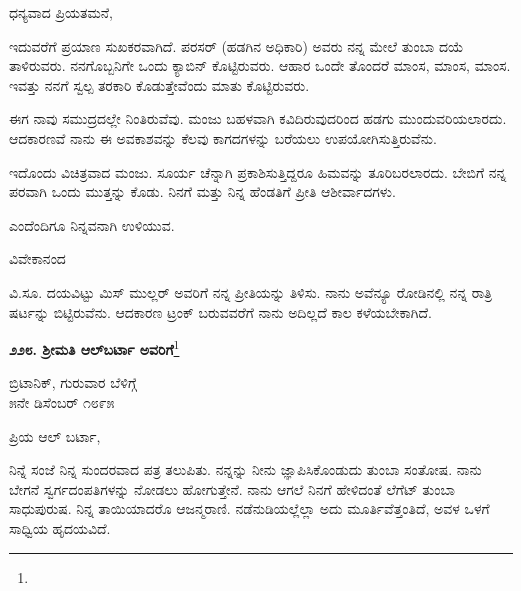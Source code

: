 \noindent
ಧನ್ಯವಾದ ಪ್ರಿಯತಮನೆ,

ಇದುವರೆಗೆ ಪ್ರಯಾಣ ಸುಖಕರವಾಗಿದೆ. ಪರಸರ್ (ಹಡಗಿನ ಅಧಿಕಾರಿ) ಅವರು ನನ್ನ ಮೇಲೆ ತುಂಬಾ ದಯೆ ತಾಳಿರುವರು. ನನಗೊಬ್ಬನಿಗೇ ಒಂದು ಕ್ಯಾಬಿನ್ ಕೊಟ್ಟಿರುವರು. ಆಹಾರ ಒಂದೇ ತೊಂದರೆ\enginline{-} ಮಾಂಸ, ಮಾಂಸ, ಮಾಂಸ. ಇವತ್ತು ನನಗೆ ಸ್ವಲ್ಪ ತರಕಾರಿ ಕೊಡುತ್ತೇವೆಂದು ಮಾತು ಕೊಟ್ಟಿರುವರು.

ಈಗ ನಾವು ಸಮುದ್ರದಲ್ಲೇ ನಿಂತಿರುವೆವು. ಮಂಜು ಬಹಳವಾಗಿ ಕವಿದಿರುವುದರಿಂದ ಹಡಗು ಮುಂದುವರಿಯಲಾರದು. ಆದಕಾರಣವೆ ನಾನು ಈ ಅವಕಾಶವನ್ನು ಕೆಲವು ಕಾಗದಗಳನ್ನು ಬರೆಯಲು ಉಪಯೋಗಿಸುತ್ತಿರುವೆನು.

ಇದೊಂದು ವಿಚಿತ್ರವಾದ ಮಂಜು. ಸೂರ್ಯ ಚೆನ್ನಾಗಿ ಪ್ರಕಾಶಿಸುತ್ತಿದ್ದರೂ ಹಿಮವನ್ನು ತೂರಿಬರಲಾರದು. ಬೇಬಿಗೆ ನನ್ನ ಪರವಾಗಿ ಒಂದು ಮುತ್ತನ್ನು ಕೊಡು. ನಿನಗೆ ಮತ್ತು ನಿನ್ನ ಹೆಂಡತಿಗೆ ಪ್ರೀತಿ ಆಶೀರ್ವಾದಗಳು.

ಎಂದೆಂದಿಗೂ ನಿನ್ನವನಾಗಿ ಉಳಿಯುವ.

\begin{flushright}
ವಿವೇಕಾನಂದ
\end{flushright}

ವಿ.ಸೂ.\enginline{-} ದಯವಿಟ್ಟು ಮಿಸ್ ಮುಲ್ಲರ್ ಅವರಿಗೆ ನನ್ನ ಪ್ರೀತಿಯನ್ನು ತಿಳಿಸು. ನಾನು ಅವೆನ್ಯೂ ರೋಡಿನಲ್ಲಿ ನನ್ನ ರಾತ್ರಿ ಷರ್ಟನ್ನು ಬಿಟ್ಟಿರುವೆನು. ಆದಕಾರಣ ಟ್ರಂಕ್ ಬರುವವರೆಗೆ ನಾನು ಅದಿಲ್ಲದೆ ಕಾಲ ಕಳೆಯಬೇಕಾಗಿದೆ.

\eject

\begin{center}
\textbf{೨೨೮. ಶ‍್ರೀಮತಿ ಆಲ್‌ಬರ್ಟಾ ಅವರಿಗೆ}\footnote{}
\end{center}

\begin{flushright}
 ಬ್ರಿಟಾನಿಕ್, ಗುರುವಾರ ಬೆಳಿಗ್ಗೆ\\೫ನೇ ಡಿಸೆಂಬರ್ ೧೮೯೫
\end{flushright}

\noindent
ಪ್ರಿಯ ಆಲ್ ಬರ್ಟಾ,

ನಿನ್ನೆ ಸಂಜೆ ನಿನ್ನ ಸುಂದರವಾದ ಪತ್ರ ತಲುಪಿತು. ನನ್ನನ್ನು ನೀನು ಜ್ಞಾಪಿಸಿಕೊಂಡುದು ತುಂಬಾ ಸಂತೋಷ. ನಾನು ಬೇಗನೆ ಸ್ವರ್ಗದಂಪತಿಗಳನ್ನು ನೋಡಲು ಹೋಗುತ್ತೇನೆ. ನಾನು ಆಗಲೆ ನಿನಗೆ ಹೇಳಿದಂತೆ ಲೆಗೆಟ್ ತುಂಬಾ ಸಾಧುಪುರುಷ. ನಿನ್ನ ತಾಯಿಯಾದರೊ ಆಜನ್ಮರಾಣಿ. ನಡೆನುಡಿಯಲ್ಲೆಲ್ಲಾ ಅದು ಮೂರ್ತಿವೆತ್ತಂತಿದೆ, ಅವಳ ಒಳಗೆ ಸಾಧ್ವಿಯ ಹೃದಯವಿದೆ.

